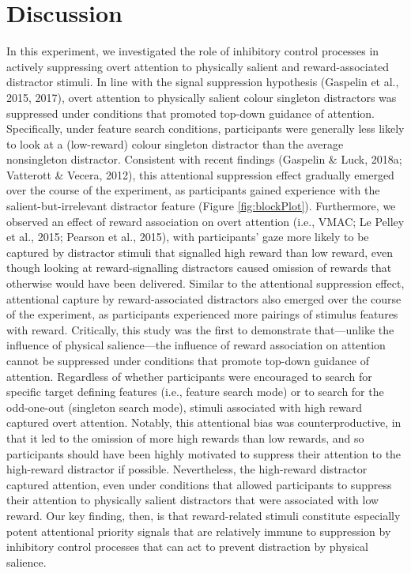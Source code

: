 \documentclass[man, a4paper, noextraspace, 11pt,floatsintext]{apa6}
\begin{document}
\section{Discussion}\label{discussion}

In this experiment, we investigated the role of inhibitory control
processes in actively suppressing overt attention to physically salient
and reward-associated distractor stimuli. In line with the signal
suppression hypothesis (Gaspelin et al., 2015, 2017), overt attention to
physically salient colour singleton distractors was suppressed under
conditions that promoted top-down guidance of attention. Specifically,
under feature search conditions, participants were generally less likely
to look at a (low-reward) colour singleton distractor than the average
nonsingleton distractor. Consistent with recent findings (Gaspelin \&
Luck, 2018a; Vatterott \& Vecera, 2012), this attentional suppression
effect gradually emerged over the course of the experiment, as
participants gained experience with the salient-but-irrelevant
distractor feature (Figure \ref{fig:blockPlot}). Furthermore, we
observed an effect of reward association on overt attention (i.e., VMAC;
Le Pelley et al., 2015; Pearson et al., 2015), with participants' gaze
more likely to be captured by distractor stimuli that signalled high
reward than low reward, even though looking at reward-signalling
distractors caused omission of rewards that otherwise would have been
delivered. Similar to the attentional suppression effect, attentional
capture by reward-associated distractors also emerged over the course of
the experiment, as participants experienced more pairings of stimulus
features with reward. Critically, this study was the first to
demonstrate that---unlike the influence of physical salience---the
influence of reward association on attention cannot be suppressed under
conditions that promote top-down guidance of attention. Regardless of
whether participants were encouraged to search for specific target
defining features (i.e., feature search mode) or to search for the
odd-one-out (singleton search mode), stimuli associated with high reward
captured overt attention. Notably, this attentional bias was
counterproductive, in that it led to the omission of more high rewards
than low rewards, and so participants should have been highly motivated
to suppress their attention to the high-reward distractor if possible.
Nevertheless, the high-reward distractor captured attention, even under
conditions that allowed participants to suppress their attention to
physically salient distractors that were associated with low reward. Our
key finding, then, is that reward-related stimuli constitute especially
potent attentional priority signals that are relatively immune to
suppression by inhibitory control processes that can act to prevent
distraction by physical salience.
\end{document}
